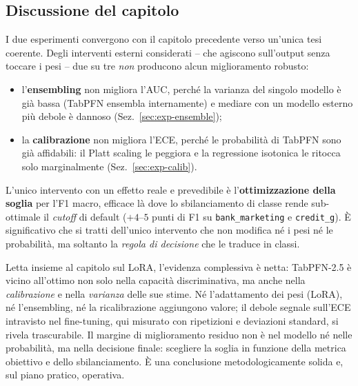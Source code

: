 \subsection{Discussione del capitolo}
\label{sec:pipeline-discussione}
I due esperimenti convergono con il capitolo precedente verso un'unica tesi
coerente. Degli interventi esterni considerati -- che agiscono sull'output senza
toccare i pesi -- due su tre \emph{non} producono alcun miglioramento robusto:
\begin{itemize}[nosep]
  \item l'\textbf{ensembling} non migliora l'AUC, perché la varianza del
  singolo modello è già bassa (TabPFN ensembla internamente) e mediare con un
  modello esterno più debole è dannoso (Sez.~\ref{sec:exp-ensemble});
  \item la \textbf{calibrazione} non migliora l'ECE, perché le probabilità di
  TabPFN sono già affidabili: il Platt scaling le peggiora e la regressione
  isotonica le ritocca solo marginalmente (Sez.~\ref{sec:exp-calib}).
\end{itemize}
L'unico intervento con un effetto reale e prevedibile è l'\textbf{ottimizzazione
della soglia} per l'F1 macro, efficace là dove lo sbilanciamento di classe rende
sub-ottimale il \emph{cutoff} di default ($+4$--$5$ punti di F1 su
\texttt{bank\_marketing} e \texttt{credit\_g}). È significativo che si tratti
dell'unico intervento che non modifica né i pesi né le probabilità, ma soltanto
la \emph{regola di decisione} che le traduce in classi.

Letta insieme al capitolo sul LoRA, l'evidenza complessiva è netta: TabPFN-2.5
è vicino all'ottimo non solo nella capacità discriminativa, ma anche nella
\emph{calibrazione} e nella \emph{varianza} delle sue stime. Né l'adattamento dei
pesi (LoRA), né l'ensembling, né la ricalibrazione aggiungono valore; il debole
segnale sull'ECE intravisto nel fine-tuning, qui misurato con ripetizioni e
deviazioni standard, si rivela trascurabile. Il margine di miglioramento residuo
non è nel modello né nelle probabilità, ma nella decisione finale: scegliere la
soglia in funzione della metrica obiettivo e dello sbilanciamento. È una
conclusione metodologicamente solida e, sul piano pratico, operativa.
